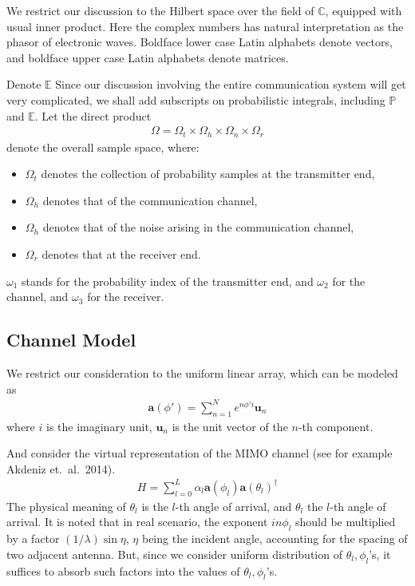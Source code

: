 \documentclass[12pt]{article}
\begin{document}
We restrict our discussion to the Hilbert space over the field of \(\mathbb{C}\), equipped with usual inner product.
Here the complex numbers has natural interpretation as the phasor of electronic waves.
Boldface lower case Latin alphabets denote vectors, and boldface upper case Latin alphabets denote matrices.

Denote \(\mathbb{E}\)
Since our discussion involving the entire communication system will get very complicated, we shall add subscripts on probabilistic integrals, including \(\mathbb{P}\) and \(\mathbb{E}\).
Let the direct product
%
\begin{gather}
\Omega
=\Omega_t \times \Omega_h \times \Omega_n \times \Omega_r
\end{gather}
%
denote the overall sample space, where:
%
\begin{itemize}
\item \(\Omega_t\) denotes the collection of probability samples at the transmitter end,
\item \(\Omega_h\) denotes that of the communication channel,
\item \(\Omega_h\) denotes that of the noise arising in the communication channel,
\item \(\Omega_r\) denotes that at the receiver end.
\end{itemize}
%
\(\omega_1\) stands for the probability index of the transmitter end, and \(\omega_2\) for the channel, and \(\omega_3\) for the receiver.



\subsection{Channel Model}

We restrict our consideration to the uniform linear array, which can be modeled as
\begin{gather}
\mathbf{a}(\phi')
=\sum_{n=1}^{N} e^{n \phi' i} \mathbf{u}_n
\end{gather}
where \(i\) is the imaginary unit, \(\mathbf{u}_n\) is the unit vector of the \(n\)-th component.

And consider the virtual representation of the MIMO channel (see for example Akdeniz et.\ al.\ 2014).
\begin{gather}
H
=\sum_{l=0}^L \alpha_l \mathbf{a}(\phi_l) \mathbf{a}(\theta_l)^\dagger
\end{gather}
The physical meaning of \(\theta_l\) is the \(l\)-th angle of arrival, and \(\theta_l\) the \(l\)-th angle of arrival.
It is noted that in real scenario, the exponent \(i n \phi_l\) should be multiplied by a factor \((1/\lambda) \sin \eta\), \(\eta\) being the incident angle, accounting for the spacing of two adjacent antenna.
But, since we consider uniform distribution of \(\theta_l, \phi_l\)'s, it suffices to absorb such factors into the values of \(\theta_l, \phi_l\)'s.
\end{document}

